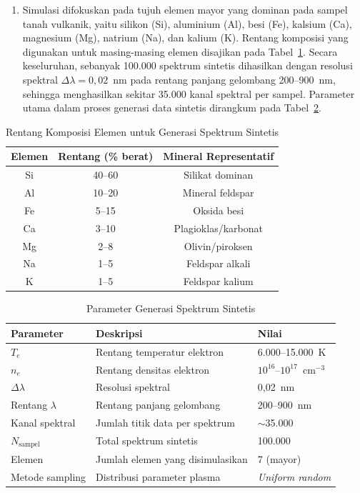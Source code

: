 \begin{enumerate}
    \item Simulasi difokuskan pada tujuh elemen mayor yang dominan pada sampel tanah vulkanik, yaitu silikon (Si), aluminium (Al), besi (Fe), kalsium (Ca), magnesium (Mg), natrium (Na), dan kalium (K). Rentang komposisi yang digunakan untuk masing-masing elemen disajikan pada Tabel~\ref{tab:komposisi_elemen}. Secara keseluruhan, sebanyak 100.000 spektrum sintetis dihasilkan dengan resolusi spektral $\Delta\lambda = 0{,}02$~nm pada rentang panjang gelombang 200--900~nm, sehingga menghasilkan sekitar 35.000 kanal spektral per sampel. Parameter utama dalam proses generasi data sintetis dirangkum pada Tabel~\ref{tab:param_sintetis}.
\end{enumerate}

\begin{table}[htbp]
  \centering
  \caption{Rentang Komposisi Elemen untuk Generasi Spektrum Sintetis}
  \label{tab:komposisi_elemen}
  \small
  \begin{tabular}{|c|c|c|}
    \hline
    \textbf{Elemen} & \textbf{Rentang (\% berat)} & \textbf{Mineral Representatif} \\
    \hline
    Si & 40--60 & Silikat dominan \\
    \hline
    Al & 10--20 & Mineral feldspar \\
    \hline
    Fe & 5--15  & Oksida besi \\
    \hline
    Ca & 3--10  & Plagioklas/karbonat \\
    \hline
    Mg & 2--8   & Olivin/piroksen \\
    \hline
    Na & 1--5   & Feldspar alkali \\
    \hline
    K  & 1--5   & Feldspar kalium \\
    \hline
  \end{tabular}
\end{table}

\begin{table}[htbp]
  \centering
  \caption{Parameter Generasi Spektrum Sintetis}
  \label{tab:param_sintetis}
  \small
  \begin{tabular}{|l|l|l|}
    \hline
    \textbf{Parameter} & \textbf{Deskripsi} & \textbf{Nilai} \\
    \hline
    $T_e$ & Rentang temperatur elektron & 6.000--15.000~K \\
    \hline
    $n_e$ & Rentang densitas elektron & $10^{16}$--$10^{17}$~cm$^{-3}$ \\
    \hline
    $\Delta\lambda$ & Resolusi spektral & 0,02~nm \\
    \hline
    Rentang $\lambda$ & Rentang panjang gelombang & 200--900~nm \\
    \hline
    Kanal spektral & Jumlah titik data per spektrum & $\sim$35.000 \\
    \hline
    $N_{\text{sampel}}$ & Total spektrum sintetis & 100.000 \\
    \hline
    Elemen & Jumlah elemen yang disimulasikan & 7 (mayor) \\
    \hline
    Metode sampling & Distribusi parameter plasma & \textit{Uniform random} \\
    \hline
  \end{tabular}
\end{table}

